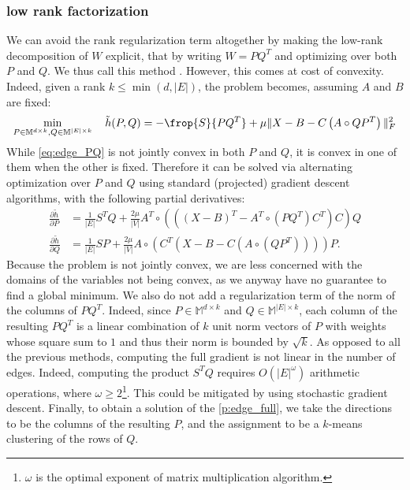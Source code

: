 \subsubsection{\pqt{} low rank factorization}

We can avoid the rank regularization term altogether by making the low-rank decomposition of $W$
explicit, that by writing $W=PQ^T$ and optimizing over both $P$ and $Q$. We thus call this method
\pqt{}. However, this comes at cost
of convexity. Indeed, given a rank $k\leq \min(d,|E|)$, the problem becomes, assuming $A$ and $B$
are fixed:
\begin{equation}
  \label{eq:edge_PQ}
  \min_{P\in\mathbb{M}^{d\times k}, Q\in\mathbb{M}^{|E|\times k}} \quad \tilde{h}(P, Q) =
  - \frop{S}{PQ^T} + \mu \|X - B - C\left(A\circ QP^T \right)\|_F^2
\end{equation}
While \eqref{eq:edge_PQ} is not jointly convex in both $P$ and $Q$, it is convex in one of
them when the other is fixed. Therefore it can be solved via alternating optimization over $P$ and
$Q$ using standard (projected) gradient descent algorithms, with the following partial derivatives:
\begin{align*}
  \frac{\partial \tilde{h}}{\partial P} &=
  \frac{1}{|E|} S^T Q + \frac{2\mu}{|V|}
  A^T \circ (((X-B)^T -A^T \circ (PQ^T )C^T )C)Q 
  \\
  \frac{\partial \tilde{h}}{\partial Q} &=
  \frac{1}{|E|} S P + \frac{2\mu}{|V|}
  A\circ (C^T (X-B-C(A\circ (QP^T ))))P.
\end{align*}
Because the problem is not jointly convex, we are less concerned with the domains of the variables
not being convex, as we anyway have no guarantee to find a global minimum. We also do not add a
regularization term of the norm of the columns of $PQ^T$. Indeed, since $P\in\mathbb{M}^{d\times k}$
and $Q\in\mathbb{M}^{|E|\times k}$, each column of the resulting $PQ^T$ is a linear combination of
$k$ unit norm vectors of $P$ with weights whose square sum to $1$ and thus their norm is bounded by
$\sqrt{k}$. As opposed to all the previous methods, computing the full gradient is not linear in the
number of edges. Indeed, computing the product $S^T Q$ requires $O(|E|^\omega)$ arithmetic
operations, where $\omega \geq 2$\footnote{$\omega$ is the optimal exponent of matrix multiplication
algorithm.}. This could be mitigated by using stochastic gradient descent. Finally, to obtain a
solution of the \ecp{} \autoref{p:edge_full}, we take the directions to be the columns of the
resulting $P$, and the assignment to be a $k$-means clustering of the rows of $Q$.

